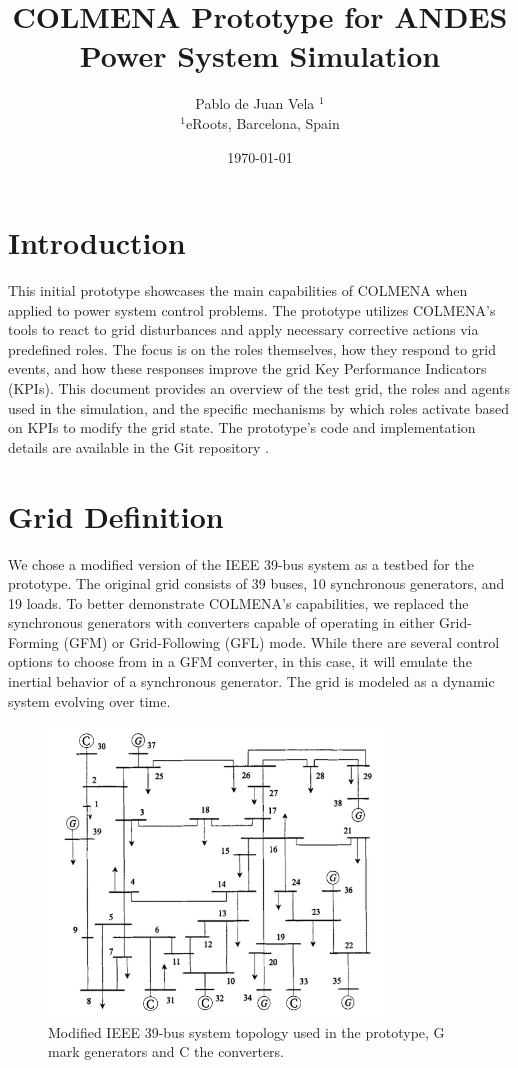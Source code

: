 \documentclass{article}
\title{COLMENA Prototype for ANDES Power System Simulation}
\author{Pablo de Juan Vela $^{1}$ \\
        \small $^{1}$eRoots, Barcelona, Spain \\
}
\date{\today}
\begin{document}
\maketitle

\section{Introduction}

This initial prototype showcases the main capabilities of COLMENA when applied to power system control problems. The prototype utilizes COLMENA's tools to react to grid disturbances and apply necessary corrective actions via predefined roles. The focus is on the roles themselves, how they respond to grid events, and how these responses improve the grid Key Performance Indicators (KPIs). This document provides an overview of the test grid, the roles and agents used in the simulation, and the specific mechanisms by which roles activate based on KPIs to modify the grid state. The prototype's code and implementation details are available in the Git repository \cite{git:eroots}.

\section{Grid Definition}

We chose a modified version of the IEEE 39-bus system \cite{grids:ieee39} as a testbed for the prototype. The original grid consists of 39 buses, 10 synchronous generators, and 19 loads. To better demonstrate COLMENA's capabilities, we replaced the synchronous generators with converters capable of operating in either Grid-Forming (GFM) or Grid-Following (GFL) mode. While there are several control options to choose from in a GFM converter, in this case, it will emulate the inertial behavior of a synchronous generator. The grid is modeled as a dynamic system evolving over time.
\begin{figure}[h]
    \centering
    \begin{center}
        \includegraphics[width=0.8\textwidth]{plots/IEEE39withtrafo.png}
    \end{center}
    \caption{Modified IEEE 39-bus system topology used in the prototype, G mark generators and C the converters.}
    \label{fig:ieee39_topology}
\end{figure}
\end{document}
